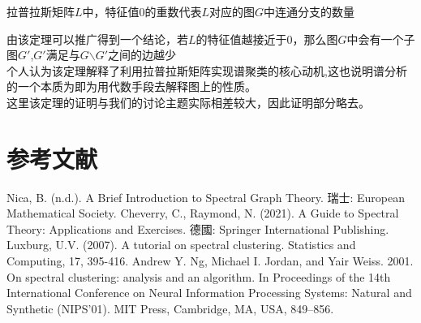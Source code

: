 \documentclass[11pt]{scrartcl}
\begin{document}
\begin{theorem}
拉普拉斯矩阵$L$中，特征值0的重数代表$L$对应的图$G$中连通分支的数量
\end{theorem}
由该定理可以推广得到一个结论，若$L$的特征值越接近于0，那么图$G$中会有一个子图$G'$,$G'$满足与$G$$\backslash$$G'$之间的边越少\\
个人认为该定理解释了利用拉普拉斯矩阵实现谱聚类的核心动机,这也说明谱分析的一个本质为即为用代数手段去解释图上的性质。\\
这里该定理的证明与我们的讨论主题实际相差较大，因此证明部分略去。




\section{参考文献}

\begin{thebibliography}{99}  
Nica, B. (n.d.). A Brief Introduction to Spectral Graph Theory. 瑞士: European Mathematical Society.
Cheverry, C., Raymond, N. (2021). A Guide to Spectral Theory: Applications and Exercises. 德國: Springer International Publishing.
Luxburg, U.V. (2007). A tutorial on spectral clustering. Statistics and Computing, 17, 395-416.
Andrew Y. Ng, Michael I. Jordan, and Yair Weiss. 2001. On spectral clustering: analysis and an algorithm. In Proceedings of the 14th International Conference on Neural Information Processing Systems: Natural and Synthetic (NIPS'01). MIT Press, Cambridge, MA, USA, 849–856.
\end{thebibliography}
\end{document}
